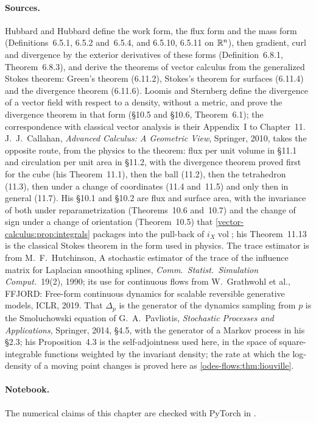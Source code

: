 \begin{notechapter}
\paragraph{Sources.} Hubbard and Hubbard define the work form, the
flux form and the mass form (Definitions~6.5.1, 6.5.2 and~6.5.4, and
6.5.10, 6.5.11 on $\mathbb{R}^n$), then gradient, curl and divergence by the
exterior derivatives of these forms (Definition~6.8.1,
Theorem~6.8.3), and derive the theorems of vector calculus from the
generalized Stokes theorem: Green's theorem (6.11.2), Stokes's theorem
for surfaces (6.11.4) and the divergence theorem (6.11.6). Loomis and
Sternberg define the divergence of a vector field with respect to a
density, without a metric, and prove the divergence theorem in that
form (\S10.5 and \S10.6, Theorem~6.1); the correspondence with
classical vector analysis is their Appendix~I to Chapter~11.
J.~J.~Callahan, \emph{Advanced Calculus: A Geometric View}, Springer,
2010, takes the opposite route, from the physics to the theorem: flux
per unit volume in \S11.1 and circulation per unit area in \S11.2, with
the divergence theorem proved first for the cube (his Theorem~11.1),
then the ball (11.2), then the tetrahedron (11.3), then under a change
of coordinates (11.4 and~11.5) and only then in general (11.7). His
\S10.1 and \S10.2 are flux and surface area, with the invariance of
both under reparametrization (Theorems~10.6 and~10.7) and the change of
sign under a change of orientation (Theorem~10.5) that
\cref{vector-calculus:prop:integrals} packages into the pull-back of
$i_X\operatorname{vol}$; his Theorem~11.13 is the classical Stokes
theorem in the form used in physics. The trace
estimator is from M.~F.~Hutchinson, A stochastic estimator of the
trace of the influence matrix for Laplacian smoothing splines,
\emph{Comm.\ Statist.\ Simulation Comput.}\ 19(2), 1990; its use for
continuous flows from W.~Grathwohl et al., FFJORD: Free-form
continuous dynamics for scalable reversible generative models, ICLR,
2019. That $\Delta_p$ is the generator of the dynamics sampling from
$p$ is the Smoluchowski equation of G.~A.~Pavliotis, \emph{Stochastic
Processes and Applications}, Springer, 2014, \S4.5, with the generator
of a Markov process in his \S2.3; his Proposition~4.3 is the
self-adjointness used here, in the space of square-integrable functions
weighted by the invariant density; the rate at which the log-density of
a moving point changes is proved here as
\cref{odes-flows:thm:liouville}.

\paragraph{Notebook.} The numerical claims of this chapter are checked
with PyTorch in .


\end{notechapter}
